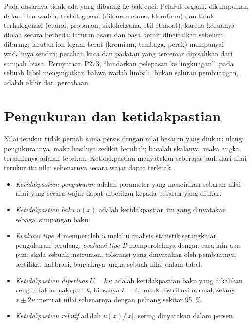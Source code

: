 \begin{inthelab}[Limbah]
Pada dasarnya tidak ada yang dibuang ke bak cuci. Pelarut organik
dikumpulkan dalam dua wadah, terhalogenasi (diklorometana, kloroform) dan
tidak terhalogenasi (etanol, propanon, sikloheksana, etil etanoat),
karena keduanya diolah secara berbeda; larutan asam dan basa berair
dinetralkan sebelum dibuang; larutan ion logam berat (kromium, tembaga,
perak) mempunyai wadahnya sendiri; pecahan kaca dan padatan yang
tercemar dipisahkan dari sampah biasa. Pernyataan P273, ``hindarkan
pelepasan ke lingkungan'', pada sebuah label mengingatkan bahwa wadah
limbah, bukan saluran pembuangan, adalah akhir dari percobaan.
\end{inthelab}

\section{Pengukuran dan ketidakpastian}

Nilai terukur tidak pernah sama persis dengan nilai besaran yang diukur:
ulangi pengukurannya, maka hasilnya sedikit berubah; bacalah skalanya,
maka angka terakhirnya adalah tebakan. Ketidakpastian menyatakan seberapa
jauh dari nilai terukur itu nilai sebenarnya secara wajar dapat terletak.

\begin{definition}\label{def:b1:lab-techniques-1:uncertainty}
\begin{itemize}
  \item \emph{Ketidakpastian pengukuran}
        adalah parameter yang mencirikan sebaran nilai-nilai yang secara
        wajar dapat diberikan kepada besaran yang diukur.
  \item \emph{Ketidakpastian baku} $u(x)$
        adalah ketidakpastian itu yang dinyatakan sebagai simpangan baku.
  \item \emph{Evaluasi tipe A} memperoleh $u$
        melalui analisis statistik serangkaian pengukuran berulang;
        \emph{evaluasi tipe B} memperolehnya dengan
        cara lain apa pun: skala sebuah instrumen, toleransi yang
        dinyatakan oleh pembuatnya, sertifikat kalibrasi, banyaknya angka
        sebuah nilai dalam tabel.
  \item \emph{Ketidakpastian diperluas}
        $U = k\,u$ adalah ketidakpastian baku yang dikalikan dengan faktor
        cakupan $k$, biasanya $k = 2$; untuk distribusi normal, selang
        $x \pm 2u$ memuat nilai sebenarnya dengan peluang sekitar
        \qty{95}{\percent}.
  \item \emph{Ketidakpastian relatif}
        adalah $u(x)/|x|$, sering dinyatakan dalam persen.
\end{itemize}
\end{definition}

